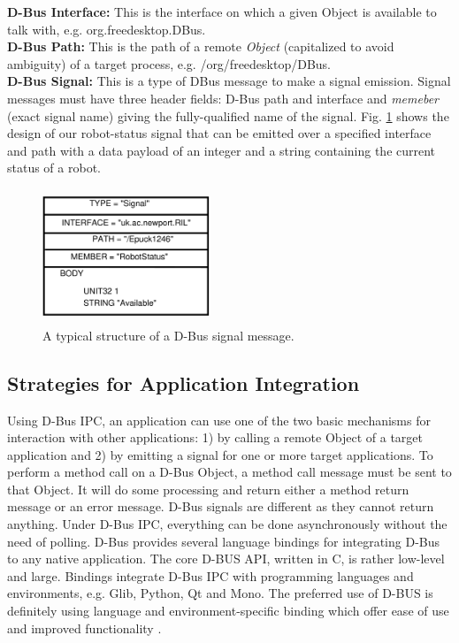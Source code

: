 \documentclass{ifacconf}
\begin{document}
\textbf{D-Bus Interface: }
This is the interface on which a given Object is available to talk with, e.g. org.freedesktop.DBus.\\
\textbf{D-Bus Path: }
This is the path of a remote \textit{Object} (capitalized to avoid ambiguity) of a target process, e.g. /org/freedesktop/DBus.\\
\textbf{D-Bus Signal: }
This is a type of DBus message to make a signal emission. Signal messages must have three header fields: D-Bus path and interface and {\em memeber} (exact signal name) giving the fully-qualified name of the signal. Fig. \ref{fig:dbus-signal-protocol}  shows the design of our robot-status signal that can be emitted over a specified interface and path with a data payload of an integer and a string containing the current status of a robot.
\begin{figure}
\begin{center}
\includegraphics[width=5cm,height=4cm]{./dia-files/dbus-signal-protocol} %
\caption{A typical structure of a D-Bus signal message.} 
\label{fig:dbus-signal-protocol}
\end{center}
\end{figure}
\subsection{Strategies for Application Integration}
Using D-Bus IPC, an application can use one of the two basic mechanisms for interaction with other applications: 1) by calling a remote Object of a target application and 2) by emitting a signal for one or more target applications. To perform a method call on a D-Bus Object, a method call message must be sent to that Object. It will do some processing and return either a method return message or an error message. D-Bus signals are different as they cannot return anything. Under D-Bus IPC, everything can be done asynchronously without the need of polling.
D-Bus provides several language bindings for integrating D-Bus to any native application. The core D-BUS API, written in C, is rather low-level and large. Bindings integrate D-Bus IPC with programming languages and environments, e.g. Glib, Python, Qt and Mono. The preferred use of D-BUS is definitely using language and environment-specific binding which offer ease of use and improved functionality \citep{Love2005}.
\end{document}

